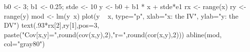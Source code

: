 \begin{Schunk}
\begin{Sinput}
 b0 <- 3; b1 <- 0.25; stde <- 10
 y <- b0 + b1 * x + stde*e1
 rx <- range(x)
 ry <- range(y)
 mod <- lm(y~x)
 plot(y ~ x, type="p", xlab="x: the IV", ylab="y: the DV")
 text(.93*rx[2],ry[1],pos=3, paste("Cov[x,y]=",round(cov(x,y),2),"\n r=",round(cor(x,y),2)))
 abline(mod, col="gray80")
\end{Sinput}
\end{Schunk}

